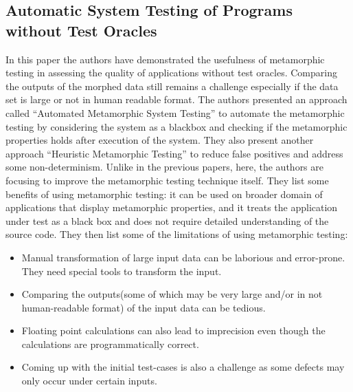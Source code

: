 	\subsection{Automatic System Testing of Programs without Test Oracles \cite{Murphy2009}}
		In this paper the authors have demonstrated the usefulness of metamorphic testing in assessing the quality of applications without test oracles. Comparing the outputs of the morphed data still remains a challenge especially if the data set is large or not in human readable format. The authors presented an approach called ``Automated Metamorphic System Testing'' to automate the metamorphic testing by considering the system as a blackbox and checking if the metamorphic properties holds after execution of the system. They also present another approach “Heuristic Metamorphic Testing” to reduce false positives and address some non-determinism. Unlike in the previous papers, here, the authors are focusing to improve the metamorphic testing technique itself. They list some benefits of using metamorphic testing: it can be used on broader domain of applications that display metamorphic properties, and it treats the application under test as a black box and does not require detailed understanding of the source code. They then list some of the limitations of using metamorphic testing:
		\begin{itemize}
			\item	Manual transformation of large input data can be laborious and error-prone. They need special tools to transform the input.
			\item Comparing the outputs(some of which may be very large and/or in not human-readable format) of the input data can be tedious.
			\item Floating point calculations can also lead to imprecision even though the calculations are programmatically correct.
			\item Coming up with the initial test-cases is also a challenge as some defects may only occur under certain inputs.
		\end{itemize}

